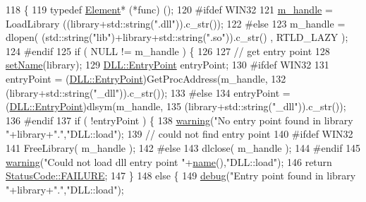 \begin{DoxyCode}
118                                          \{
119   \textcolor{keyword}{typedef} \hyperlink{classElement}{Element}* (*func) ();
120 \textcolor{preprocessor}{#ifdef WIN32
}
121   \hyperlink{classDLL_a2ca22015aef35c5d61f8daaf3c070154}{m\_handle} = LoadLibrary ((library+std::string(\textcolor{stringliteral}{".dll"})).c\_str());
122 \textcolor{preprocessor}{#else
}
123   m\_handle = dlopen( (std::string(\textcolor{stringliteral}{"lib"})+library+std::string(\textcolor{stringliteral}{".so"})).c\_str() , RTLD\_LAZY );
124 \textcolor{preprocessor}{#endif
}
125   \textcolor{keywordflow}{if} ( NULL != m\_handle ) \{
126 
127     \textcolor{comment}{// get entry point}
128     \hyperlink{classDLL_afc65a270b32a08d0681819cf2317aef0}{setName}(library);
129     \hyperlink{classDLL_a6d72472c2f54dc82cbb6a5bbab70dae6}{DLL::EntryPoint} entryPoint;
130 \textcolor{preprocessor}{#ifdef WIN32
}
131     entryPoint = (\hyperlink{classDLL_a6d72472c2f54dc82cbb6a5bbab70dae6}{DLL::EntryPoint})GetProcAddress(m\_handle,
132                                                  (library+std::string(\textcolor{stringliteral}{"\_dll"})).c\_str());
133 \textcolor{preprocessor}{#else
}
134     entryPoint = (\hyperlink{classDLL_a6d72472c2f54dc82cbb6a5bbab70dae6}{DLL::EntryPoint})dlsym(m\_handle,
135                                        (library+std::string(\textcolor{stringliteral}{"\_dll"})).c\_str());
136 \textcolor{preprocessor}{#endif
}
137     \textcolor{keywordflow}{if} ( !entryPoint ) \{
138       \hyperlink{classDLL_a4bbc341bad623eedb5c228c91ce2e858}{warning}(\textcolor{stringliteral}{"No entry point found in library "}+library+\textcolor{stringliteral}{"."},\textcolor{stringliteral}{"DLL::load"});
139       \textcolor{comment}{// could not find entry point}
140 \textcolor{preprocessor}{#ifdef WIN32
}
141       FreeLibrary( m\_handle );
142 \textcolor{preprocessor}{#else
}
143       dlclose( m\_handle );
144 \textcolor{preprocessor}{#endif
}
145       \hyperlink{classDLL_a4bbc341bad623eedb5c228c91ce2e858}{warning}(\textcolor{stringliteral}{"Could not load dll entry point "}+\hyperlink{classDLL_a0a915d538771dde2cb0580cd340ee088}{name}(),\textcolor{stringliteral}{"DLL::load"});
146       \textcolor{keywordflow}{return} \hyperlink{classStatusCode_a6f565cbeadc76d14c72f047e5e85eb4ba3da73d4c469762eb9d3c960368252b26}{StatusCode::FAILURE};
147     \}
148     \textcolor{keywordflow}{else} \{
149       \hyperlink{classDLL_ab3fb4a13b4308047d42b27b6943a47da}{debug}(\textcolor{stringliteral}{"Entry point found in library "}+library+\textcolor{stringliteral}{"."},\textcolor{stringliteral}{"DLL::load"});

\end{DoxyCode}
